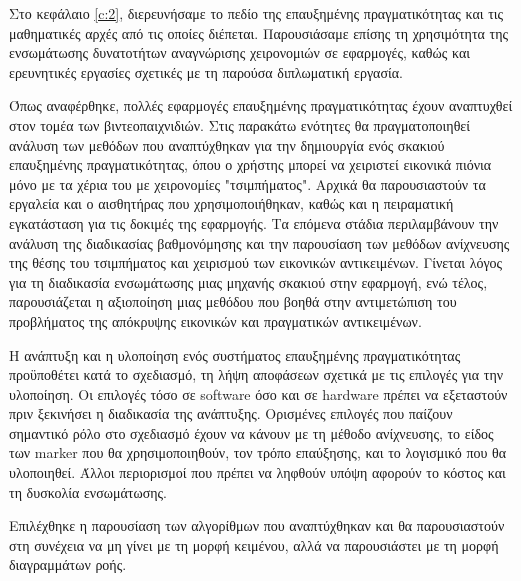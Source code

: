 

 \label{c:design}



Στο κεφάλαιο \ref{c:2}, διερευνήσαμε το πεδίο της επαυξημένης πραγματικότητας και τις μαθηματικές αρχές από τις οποίες διέπεται. Παρουσιάσαμε επίσης τη χρησιμότητα της ενσωμάτωσης δυνατοτήτων αναγνώρισης χειρονομιών σε εφαρμογές, καθώς και ερευνητικές εργασίες σχετικές με τη παρούσα διπλωματική εργασία.


Όπως αναφέρθηκε, πολλές εφαρμογές επαυξημένης πραγματικότητας έχουν αναπτυχθεί στον τομέα των βιντεοπαιχνιδιών. Στις παρακάτω ενότητες θα πραγματοποιηθεί ανάλυση των μεθόδων που αναπτύχθηκαν για την δημιουργία ενός σκακιού επαυξημένης πραγματικότητας, όπου ο χρήστης μπορεί να χειριστεί εικονικά πιόνια μόνο με τα χέρια του με χειρονομίες "τσιμπήματος". Αρχικά θα παρουσιαστούν τα εργαλεία και ο αισθητήρας που χρησιμοποιήθηκαν, καθώς και η πειραματική εγκατάσταση για τις δοκιμές της εφαρμογής. Τα επόμενα στάδια περιλαμβάνουν την ανάλυση της διαδικασίας βαθμονόμησης και την παρουσίαση των μεθόδων ανίχνευσης της θέσης του τσιμπήματος και χειρισμού των εικονικών αντικειμένων. Γίνεται λόγος για τη διαδικασία ενσωμάτωσης μιας μηχανής σκακιού στην εφαρμογή, ενώ τέλος, παρουσιάζεται η αξιοποίηση μιας μεθόδου που βοηθά στην αντιμετώπιση του προβλήματος της απόκρυψης εικονικών και πραγματικών αντικειμένων.




Η ανάπτυξη και η υλοποίηση ενός συστήματος επαυξημένης πραγματικότητας προϋποθέτει κατά το σχεδιασμό, τη λήψη αποφάσεων σχετικά με τις επιλογές για την υλοποίηση. Οι επιλογές τόσο σε software όσο και σε hardware πρέπει να εξεταστούν πριν ξεκινήσει η διαδικασία της ανάπτυξης. Ορισμένες επιλογές που παίζουν σημαντικό ρόλο στο σχεδιασμό έχουν να κάνουν με τη μέθοδο ανίχνευσης, το είδος των marker που θα χρησιμοποιηθούν, τον τρόπο επαύξησης, και το λογισμικό που θα υλοποιηθεί. Άλλοι περιορισμοί που πρέπει να ληφθούν υπόψη αφορούν το κόστος και τη δυσκολία ενσωμάτωσης.


Επιλέχθηκε η παρουσίαση των αλγορίθμων που αναπτύχθηκαν και θα παρουσιαστούν στη συνέχεια να μη γίνει με τη μορφή κειμένου, αλλά να παρουσιάστει με τη μορφή διαγραμμάτων ροής.




